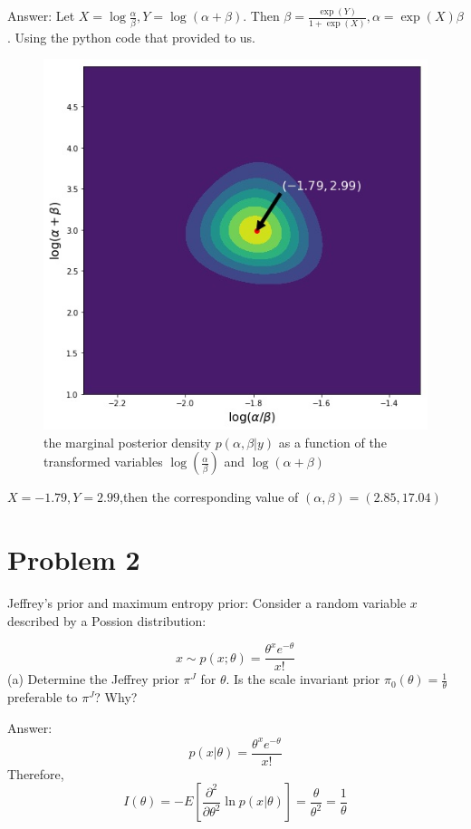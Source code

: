 \documentclass{article}
\begin{document}
Answer:
Let $X = \log{\frac{\alpha}{\beta}}, Y = \log(\alpha+\beta)$. Then $\beta = \frac{\exp(Y)}{1+\exp(X)}, \alpha = \exp(X)\beta$.
Using the python code that provided to us. 
\begin{figure}[ht]
\centering
\includegraphics[scale=0.5]{hw2_1b.jpg}
\caption{the marginal posterior density $p(\alpha,\beta|y)$ as a function of the transformed variables $\log(\frac{\alpha}{\beta})$ and $\log(\alpha+\beta)$}
\end{figure}

$X = -1.79, Y = 2.99$,then the corresponding value of $(\alpha,\beta) = (2.85,17.04)$


\newpage
\section{Problem 2}
Jeffrey's prior and maximum entropy prior: Consider a random variable $x$ described by a Possion distribution:

\begin{equation}
    x \sim p(x;\theta) = \frac{\theta^x e^{-\theta}}{x!}
\end{equation}
(a) Determine the Jeffrey prior $\pi^{J}$ for $\theta$. Is the scale invariant prior $\pi_{0}(\theta) = \frac{1}{\theta}$ preferable to $\pi^{J}$? Why?


Answer:
\begin{equation}
   p(x|\theta) = \frac{\theta^x e^{-\theta}}{x!}
\end{equation}
Therefore,
\begin{equation}
   I(\theta) = -E\left[\frac{\partial^2}{\partial \theta^2} \ln p(x|\theta)\right] = \frac{\theta}{\theta^2} = \frac{1}{\theta}
\end{equation}
\end{document}
